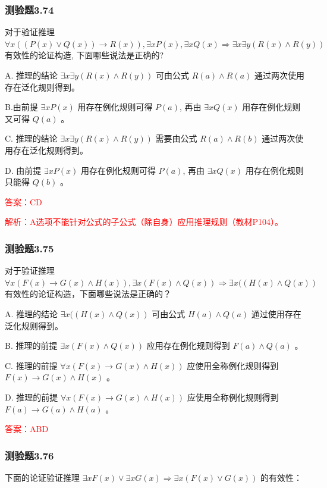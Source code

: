 \documentclass[UTF8, heading=true]{ctexart}
\begin{document}
\subsubsection{测验题3.74}

对于验证推理 $\forall x((P(x) \vee Q(x)) \rightarrow R(x)), \exists x P(x), \exists x Q(x) \Longrightarrow \exists x \exists y(R(x) \wedge R(y))$ 有效性的论证构造, 下面哪些说法是正确的?

A. 推理的结论 $\exists x \exists y(R(x) \wedge R(y))$ 可由公式 $R(a) \wedge R(a)$ 通过两次使用存在泛化规则得到。

B.由前提 $\exists x P(x)$ 用存在例化规则可得 $P(a)$, 再由 $\exists x Q(x)$ 用存在例化规则又可得 $Q(a)$ 。

C. 推理的结论 $\exists x \exists y(R(x) \wedge R(y))$ 需要由公式 $R(a) \wedge R(b)$ 通过两次使用存在泛化规则得到。

D. 由前提 $\exists x P(x)$ 用存在例化规则可得 $P(a)$, 再由 $\exists x Q(x)$ 用存在例化规则只能得 $Q(b)$ 。

\textcolor{red}{答案：CD}

\textcolor{red}{解析：A选项不能针对公式的子公式（除自身）应用推理规则（教材P104）。}

\subsubsection{测验题3.75}

对于验证推理 $\forall x(F(x) \rightarrow G(x) \wedge H(x)), \exists x(F(x) \wedge Q(x)) \Longrightarrow \exists x((H(x) \wedge Q(x))$ 有效性的论证构造，下面哪些说法是正确的？

A.
推理的结论 $\exists x((H(x) \wedge Q(x))$ 可由公式 $H(a) \wedge Q(a)$ 通过使用存在泛化规则得到。

B.
推理的前提 $\exists x(F(x) \wedge Q(x))$ 应用存在例化规则得到 $F(a) \wedge Q(a)$ 。

C.
推理的前提 $\forall x(F(x) \rightarrow G(x) \wedge H(x))$ 应使用全称例化规则得到 $F(x) \rightarrow G(x) \wedge H(x)$ 。

D.
推理的前提 $\forall x(F(x) \rightarrow G(x) \wedge H(x))$ 应使用全称例化规则得到 $F(a) \rightarrow G(a) \wedge H(a)$ 。

\textcolor{red}{答案：ABD}

\subsubsection{测验题3.76}

下面的论证验证推理 $\exists x F(x) \vee \exists x G(x) \Longrightarrow \exists x(F(x) \vee G(x))$ 的有效性：
\end{document}
